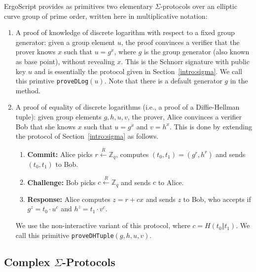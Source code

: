 \documentclass[11pt]{article}
\newcommand{\langname}{ErgoScript\xspace}
\begin{document}
\langname provides as primitives two elementary $\Sigma$-protocols over an elliptic curve group of prime order, written here in multiplicative notation:
\begin{enumerate}
	\item A proof of knowledge of discrete logarithm with respect to a fixed group generator: given a group element $u$, the proof convinces a verifier that the prover knows $x$ such that $u=g^x$, where $g$ is the group generator (also known as base point), without revealing $x$. This is the Schnorr signature with public key $u$ and is essentially the protocol given in Section~\ref{intro:sigma}. 
	We call this primtive \texttt{proveDLog}$(u)$. Note that there is a default generator $g$ in the method. 
	

	\item A proof of equality of discrete logarithms (i.e., a proof of a Diffie-Hellman tuple): given group elements $g, h, u, v$, the prover, Alice convinces a verifier Bob that she knows $x$ such that $u={g}^x$ and $v={h}^x$. This is done by extending the protocol of Section~\ref{intro:sigma} as follows. 
	\begin{enumerate}
		\item \textbf{Commit:} Alice picks $r \stackrel{R}{\leftarrow} \mathbb{Z}_q$, computes $(t_0, t_1) = ({g}^r, {h}^r)$ and sends $(t_0, t_1)$ to Bob.
		\item \textbf{Challenge:} Bob picks $c \stackrel{R}{\leftarrow} \mathbb{Z}_q$ and sends $c$ to Alice.
		\item \textbf{Response:} Alice computes $z = r + cx$ and sends $z$ to Bob, who accepts if ${g}^z = {t_0}\cdot {u}^c$ and $h^z=t_1\cdot v^c$. %
	\end{enumerate}
	
	We use the non-interactive variant of this protocol, where $c = H(t_0 \Vert t_1)$. We call this primitive \texttt{proveDHTuple}$(g, h, u, v)$.
	
\end{enumerate}


\subsection{Complex $\Sigma$-Protocols}
\end{document}
